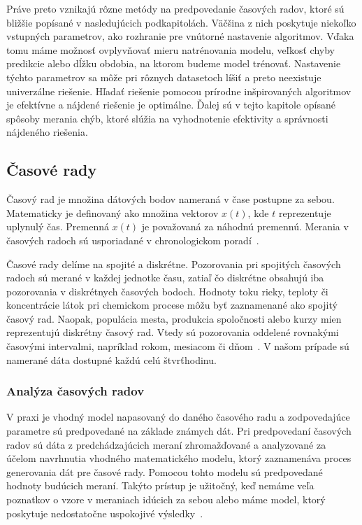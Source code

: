 \documentclass[a4paper,slovak,12pt,appendix]{article}
\begin{document}
Práve preto vznikajú rôzne metódy na predpovedanie časových radov, ktoré sú
bližšie popísané v nasledujúcich podkapitolách. Väčšina z nich poskytuje
niekoľko vstupných parametrov, ako rozhranie pre vnútorné nastavenie algoritmov.
Vďaka tomu máme možnosť ovplyvňovať mieru natrénovania modelu, veľkosť chyby
predikcie alebo dĺžku obdobia, na ktorom budeme model trénovať. Nastavenie
týchto parametrov sa môže pri rôznych datasetoch líšiť a preto neexistuje
univerzálne riešenie. Hľadať riešenie pomocou prírodne inšpirovaných
algoritmov je efektívne a nájdené riešenie je optimálne. Ďalej sú v tejto
kapitole opísané spôsoby merania chýb, ktoré slúžia na vyhodnotenie efektivity
a správnosti nájdeného riešenia.


\subsection{Časové rady}
Časový rad je množina dátových bodov nameraná v čase postupne za sebou.
Matematicky je definovaný ako množina vektorov $x(t)$, kde $t$ reprezentuje
uplynulý čas. Premenná $x(t)$ je považovaná za náhodnú premennú.
Merania v časových radoch sú usporiadané v chronologickom
poradí~\cite{Agrawal2013}.

Časové rady delíme na spojité a diskrétne. Pozorovania pri spojitých časových
radoch sú merané v každej jednotke času, zatiaľ čo diskrétne obsahujú iba
pozorovania v diskrétnych časových bodoch. Hodnoty toku rieky, teploty
či koncentrácie látok pri chemickom procese môžu byť zaznamenané ako spojitý
časový rad. Naopak, populácia mesta, produkcia spoločnosti alebo kurzy mien
reprezentujú diskrétny časový rad. Vtedy sú pozorovania oddelené rovnakými
časovými intervalmi, napríklad rokom, mesiacom či dňom~\cite{Agrawal2013}. V našom
prípade sú namerané dáta dostupné každú celú štvrťhodinu.

\subsubsection{Analýza časových radov}
\label{time-series-analysis}
V praxi je vhodný model napasovaný do daného časového radu a zodpovedajúce
parametre sú predpovedané na základe známych dát. Pri predpovedaní časových
radov sú dáta z predchádzajúcich meraní zhromažďované a analyzované za účelom
navrhnutia vhodného matematického modelu, ktorý zaznamenáva proces generovania
dát pre časové rady. Pomocou tohto modelu sú predpovedané hodnoty budúcich
meraní. Takýto prístup je užitočný, keď nemáme veľa poznatkov o vzore
v meraniach idúcich za sebou alebo máme model, ktorý poskytuje nedostatočne
uspokojivé výsledky~\cite{Agrawal2013}.
\end{document}
